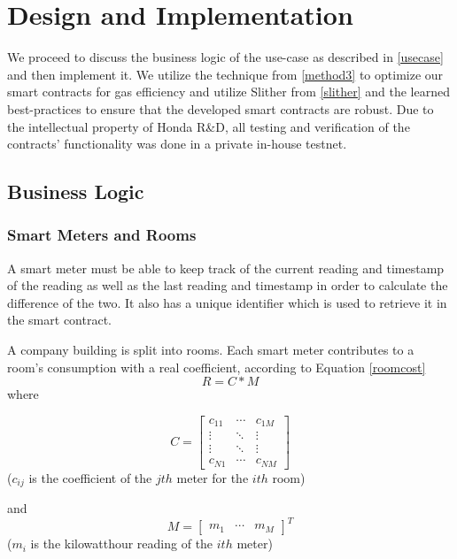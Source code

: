 \chapter{Design and Implementation}
We proceed to discuss the business logic of the use-case as described in \ref{usecase} and then implement it. We utilize the technique from \ref{method3} to optimize our smart contracts for gas efficiency and utilize Slither from \ref{slither} and the learned best-practices to ensure that the developed smart contracts are robust. Due to the intellectual property of Honda R\&D, all testing and verification of the contracts' functionality was done in a private in-house testnet.

\section{Business Logic}

\subsection{Smart Meters and Rooms}

A smart meter must be able to keep track of the current reading and timestamp of the reading as well as the last reading and timestamp in order to calculate the difference of the two. It also has a unique identifier which is used to retrieve it in the smart contract.

A company building is split into rooms. Each smart meter contributes to a room's consumption with a real coefficient, according to Equation \ref{roomcost}
\begin{equation}\label{roomcost}
R = C * M
\end{equation}
\noindent where
\begin{description}
\item  \[C = 
\begin{bmatrix}
    c_{11} & \cdots & c_{1M} \\
    \vdots & \ddots & \vdots \\ 
    \vdots & \ddots & \vdots \\
    c_{N1} & \cdots & c_{NM}
  \end{bmatrix}\] ($c_{ij}$ is the coefficient of the $jth$ meter for the $ith$ room)

\item  and \[M = 
\begin{bmatrix}
    m_{1} & \cdots & m_{M}
\end{bmatrix}^T\] ($m_{i}$ is the kilowatthour reading of the $ith$ meter)
\end{description}

